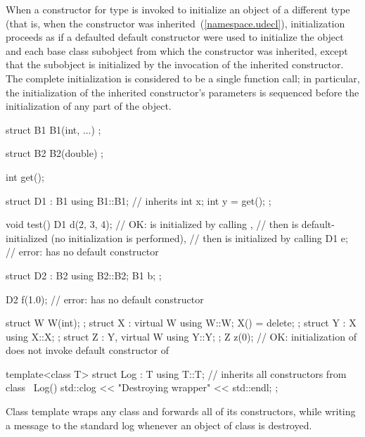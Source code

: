 \pnum
When a constructor for type  is invoked
to initialize an object of a different type 
(that is, when the constructor was inherited~(\ref{namespace.udecl}),
initialization proceeds as if a defaulted default constructor
were used to initialize the  object and
each base class subobject from which the constructor was inherited,
except that the  subobject is initialized
by the invocation of the inherited constructor.
The complete initialization is considered to be a single function call;
in particular, the initialization of the inherited constructor's parameters
is sequenced before the initialization of any part of the  object.
\enterexample
\begin{codeblock}
struct B1 {
  B1(int, ...) { }
};

struct B2 {
  B2(double) { }
};

int get();

struct D1 : B1 {
  using B1::B1;  // inherits 
  int x;
  int y = get();
};

void test() {
  D1 d(2, 3, 4); // OK:  is initialized by calling ,
                 // then  is default-initialized (no initialization is performed),
                 // then  is initialized by calling 
  D1 e;          // error:  has no default constructor
}

struct D2 : B2 {
  using B2::B2;
  B1 b;
};

D2 f(1.0);       // error:  has no default constructor

struct W { W(int); };
struct X : virtual W { using W::W; X() = delete; };
struct Y : X { using X::X; };
struct Z : Y, virtual W { using Y::Y; };
Z z(0); // OK: initialization of  does not invoke default constructor of 

template<class T> struct Log : T {
  using T::T;    // inherits all constructors from class 
  ~Log() { std::clog << "Destroying wrapper" << std::endl; }
};
\end{codeblock}
Class template  wraps any class and forwards all of its constructors,
while writing a message to the standard log
whenever an object of class  is destroyed.
\exitexample

